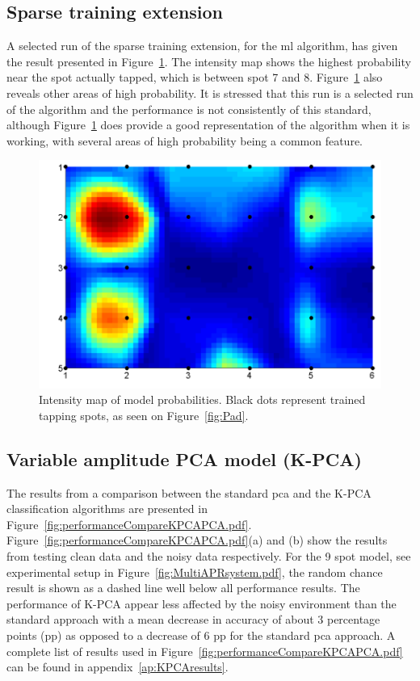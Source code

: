 \subsection{Sparse training extension}

A selected run of the sparse training extension, for the \gls{ml} algorithm, has given the result presented in Figure~\ref{fig:padPlot}. The intensity map shows the highest probability near the spot actually tapped, which is between spot 7 and 8. Figure~\ref{fig:padPlot} also reveals other areas of high probability. It is stressed that this run is a selected run of the algorithm and the performance is not consistently of this standard, although Figure~\ref{fig:padPlot} does provide a good representation of the algorithm when it is working, with several areas of high probability being a common feature.

\begin{figure}[!]
\centering
\includegraphics[width=150mm]{padPlot.pdf}
\caption{Intensity map of model probabilities. Black dots represent trained tapping spots, as seen on Figure~\ref{fig:Pad}. }\label{fig:padPlot}
\end{figure}

\subsection{Variable amplitude PCA model (K-PCA)}

The results from a comparison between the standard \gls{pca} and the K-PCA classification algorithms are presented in Figure~\ref{fig:performanceCompareKPCAPCA.pdf}. Figure~\ref{fig:performanceCompareKPCAPCA.pdf}(a) and (b) show the results from testing clean data and the noisy data respectively. For the 9 spot model, see experimental setup in Figure~\ref{fig:MultiAPRsystem.pdf}, the random chance result is shown as a dashed line well below all performance results. The performance of K-PCA appear less affected by the noisy environment than the standard approach with a mean decrease in accuracy of about 3 percentage points (pp) as opposed to a decrease of 6 pp for the standard \gls{pca} approach. A complete list of results used in Figure~\ref{fig:performanceCompareKPCAPCA.pdf} can be found in appendix~\ref{ap:KPCAresults}.

